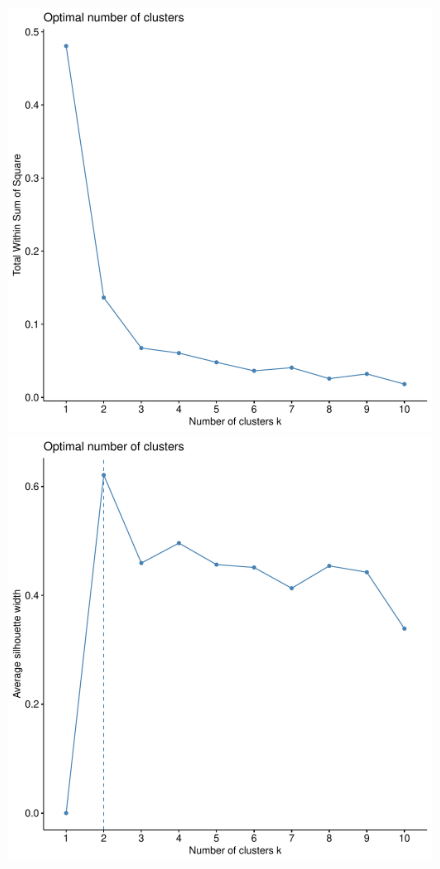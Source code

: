 \documentclass[11pt]{article}
\begin{document}
\begin{figure}[h]
  \centering
  \includegraphics[scale=0.3]{../plot/kmeans-inertia.pdf}
  \includegraphics[scale=0.3]{../plot/kmeans-silhouette.pdf}

\end{figure}
\end{document}
